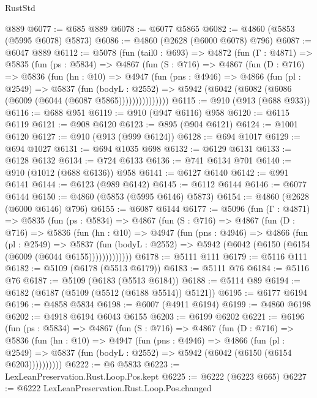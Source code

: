 \begin{lexlean}{RustStd}
\begin{coremodule}
    @889
@6077 := @685 @889
@6078 := @6077 @5865
@6082 := @4860 (@5853 (@5995 @6078) @5873)
@6086 := @4860 (@2628 (@6000 @6078) @796)
@6087 := @6047 @889
@6112 := @5078
    (fun (tail0 : @693) =>
    @4872
      (fun (Γ : @4871) =>
      @5835
        (fun (ps : @5834) =>
        @4867
          (fun (S : @716) =>
          @4867
            (fun (D : @716) =>
            @5836
              (fun (hn : @10) =>
              @4947
                (fun (pns : @4946) =>
                @4866
                  (fun (pl : @2549) =>
                  @5837
                    (fun (bodyL : @2552) =>
                    @5942 (@6042 (@6082 (@6086 (@6009 (@6044 (@6087 @5865)))))))))))))))
@6115 := @910 (@913 (@688 @933))
@6116 := @688 @951
@6119 := @910 (@947 @6116) @958
@6120 := @6115 @6119
@6121 := @908 @6120
@6123 := @895 (@904 @6121)
@6124 := @1001 @6120
@6127 := @910 (@913 (@999 @6124))
@6128 := @694 @1017
@6129 := @694 @1027
@6131 := @694 @1035 @698
@6132 := @6129 @6131
@6133 := @6128 @6132
@6134 := @724 @6133
@6136 := @741 @6134 @701
@6140 := @910 (@1012 (@688 @6136)) @958
@6141 := @6127 @6140
@6142 := @991 @6141
@6144 := @6123 (@989 @6142)
@6145 := @6112 @6144
@6146 := @6077 @6144
@6150 := @4860 (@5853 (@5995 @6146) @5873)
@6154 := @4860 (@2628 (@6000 @6146) @796)
@6155 := @6087 @6144
@6177 := @5096
    (fun (Γ : @4871) =>
    @5835
      (fun (ps : @5834) =>
      @4867
        (fun (S : @716) =>
        @4867
          (fun (D : @716) =>
          @5836
            (fun (hn : @10) =>
            @4947
              (fun (pns : @4946) =>
              @4866
                (fun (pl : @2549) =>
                @5837
                  (fun (bodyL : @2552) =>
                  @5942 (@6042 (@6150 (@6154 (@6009 (@6044 @6155)))))))))))))
@6178 := @5111 @111
@6179 := @5116 @111
@6182 := @5109 (@6178 (@5513 @6179))
@6183 := @5111 @76
@6184 := @5116 @76
@6187 := @5109 (@6183 (@5513 @6184))
@6188 := @5114 @89
@6194 := @6182 (@6187 (@5109 (@5512 (@6188 @5514)) @5121))
@6195 := @6177 @6194
@6196 := @4858 @5834
@6198 := @6007 (@4911 @6194)
@6199 := @4860 @6198
@6202 := @4918 @6194 @6043 @6155
@6203 := @6199 @6202
@6221 := @6196
    (fun (ps : @5834) =>
    @4867
      (fun (S : @716) =>
      @4867
        (fun (D : @716) =>
        @5836
          (fun (hn : @10) =>
          @4947
            (fun (pns : @4946) =>
            @4866
              (fun (pl : @2549) =>
              @5837 (fun (bodyL : @2552) => @5942 (@6042 (@6150 (@6154 @6203))))))))))
@6222 := @6 @5833
@6223 := LexLeanPreservation.Rust.Loop.Pos.kept
@6225 := @6222 (@6223 @665)
@6227 := @6222 LexLeanPreservation.Rust.Loop.Pos.changed

\end{coremodule}
\end{lexlean}

